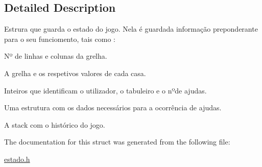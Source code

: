 \subsection{Detailed Description}
Estrura que guarda o estado do jogo. Nela é guardada informação preponderante para o seu funciomento, tais como \+:
\begin{DoxyItemize}
\item Nº de linhas e colunas da grelha.
\item A grelha e os respetivos valores de cada casa.
\item Inteiros que identificam o utilizador, o tabuleiro e o nºde ajudas.
\item Uma estrutura com os dados necessários para a ocorrência de ajudas.
\item A stack com o histórico do jogo. 
\end{DoxyItemize}

The documentation for this struct was generated from the following file\+:\begin{DoxyCompactItemize}
\item 
\hyperlink{estado_8h}{estado.\+h}\end{DoxyCompactItemize}
